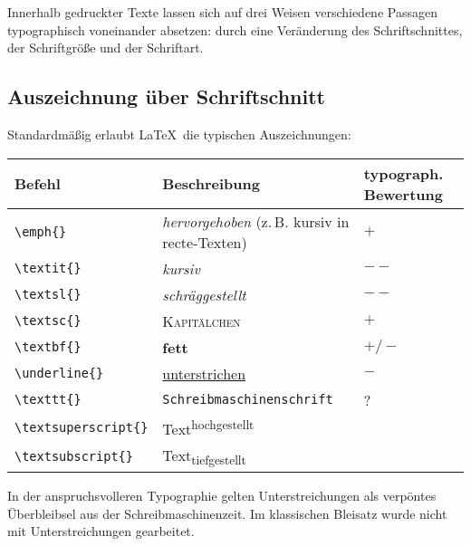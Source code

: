 
Innerhalb gedruckter Texte lassen sich auf drei Weisen verschiedene Passagen typographisch voneinander
absetzen:
durch eine Veränderung des Schriftschnittes,
der Schriftgröße und
der Schriftart.

\subsection{Auszeichnung über Schriftschnitt}

Standardmäßig erlaubt \LaTeX\ die typischen Auszeichnungen:

\begin{center}
\begin{tabular}{lll}
      Befehl                &       Beschreibung                        & typograph. Bewertung \\
      \hline
 \lstinline/\emph{}/        &   \emph{hervorgehoben} (z.\,B. kursiv in recte-Texten)        &   $+$ \\
 \lstinline/\textit{}/      &       \textsl{kursiv}                     &   $--$\\
 \lstinline/\textsl{}/      &       \textsl{schräggestellt}             &   $--$\\
 \lstinline/\textsc{}/      &       \textsc{Kapitälchen}                &   $+$ \\
 \lstinline/\textbf{}/      &       \textbf{fett}                       &   $+/-$ \\
 \lstinline/\underline{}/   &       \underline{unterstrichen}           &   $-$ \\
 \lstinline/\texttt{}/      &       \texttt{Schreibmaschinenschrift}    &   ? \\
 \lstinline/\textsuperscript{}/ &   Text\textsuperscript{hochgestellt}  &     \\
 \lstinline/\textsubscript{}/ &     Text\textsubscript{tiefgestellt}    &     \\
 \end{tabular} 
\end{center}


In der anspruchsvolleren Typographie gelten Unterstreichungen als verpöntes Überbleibsel
aus der Schreibmaschinenzeit. Im klassischen Bleisatz wurde nicht mit Unterstreichungen
gearbeitet.


